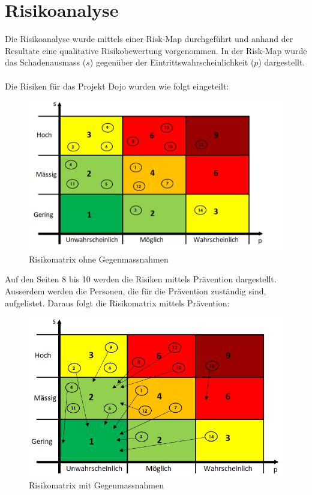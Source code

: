 \documentclass[10pt,a4paper,oneside]{99_fhnwreport}
\begin{document}
\section{Risikoanalyse}\label{sec:risikoanalyse}
Die Risikoanalyse wurde mittels einer Risk-Map durchgeführt und anhand der Resultate eine qualitative Risikobewertung vorgenommen. In der Risk-Map wurde das Schadenausmass ($s$) gegenüber der Eintrittswahrscheinlichkeit ($p$) dargestellt.\\
\\
Die Risiken für das Projekt Dojo wurden wie folgt eingeteilt:

\begin{figure}[htbp]
	\centering
	\includegraphics[width=13.5cm]{risiko1.png}
	\caption{Risikomatrix ohne Gegenmassnahmen}
\end{figure}

\newpage

Auf den Seiten 8 bis 10 werden die Risiken mittels Prävention dargestellt.
Ausserdem werden die Personen, die für die Prävention zuständig sind, aufgelistet.
Daraus folgt die Risikomatrix mittels Prävention:

\begin{figure}[htbp]
	\centering
	\includegraphics[width=13.5cm]{risiko2.png}
	\caption{Risikomatrix mit Gegenmassnahmen}
\end{figure}
\end{document}
